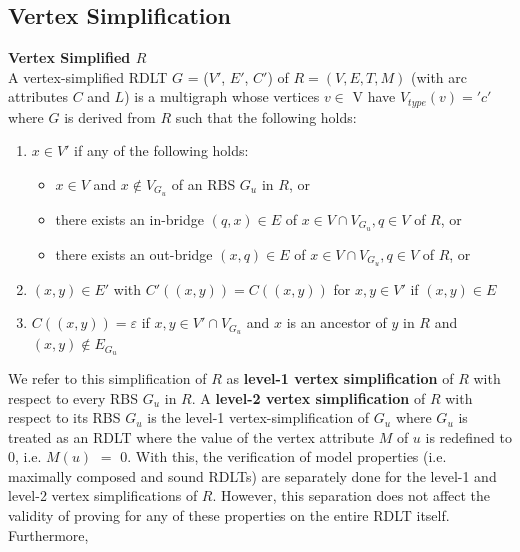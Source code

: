\subsection*{Vertex Simplification}
\begin{defn}\textbf{Vertex Simplified $R$} \cite{Malinao2017}\\
    \label{VertexSimpDef}
     A vertex-simplified RDLT $ G $ = ($ V' $, $ E' $, $ C' $) of $ R = (V, E, T, M) $ (with arc attributes $ C $ and $ L $) is a multigraph whose vertices $ v \in $ V have $ V_{type}(v) = 'c' $ where $ G $ is derived from $ R $ such that the following holds:
     \begin{enumerate}
         \item $ x \in V' $ if any of the following holds:
         \begin{itemize}
             \item $ x \in V $ and $ x \notin V_{G_u} $ of an RBS $ G_u $ in $ R $, or
             \item there exists an in-bridge $ (q, x) \in E $ of $ x \in V \cap V_{G_u}, q \in V $ of $ R $, or
             \item there exists an out-bridge $ (x, q) \in E $ of $ x \in V \cap V_{G_u}, q \in V $ of $ R $, or
         \end{itemize}
         \item $ (x, y) \in E' $ with $ C'((x, y)) = C((x, y)) $ for $ x, y \in V' $ if $ (x, y) \in E $
         \item $ C((x, y)) = \varepsilon $ if $ x, y \in V' \cap V_{G_u} $ and $ x $ is an ancestor of $ y $ in $ R $ and $ (x, y) \notin E_{G_u} $  
     \end{enumerate}

     We refer to this simplification of $ R $ as \textbf{level-1 vertex simplification} of $ R $ with respect to every RBS $ G_u $ in $ R $. A \textbf{level-2 vertex simplification} of $ R $ with respect to its RBS $ G_u $ is the level-1 vertex-simplification of $ G_u $ where $ G_u $ is treated as an RDLT where the value of the vertex attribute $ M $ of $ u $ is redefined to $ 0 $, i.e. $ M(u) $ $ = $ $ 0 $. With this, the verification of model properties (i.e. maximally composed and sound RDLTs) are separately done for the level-1 and level-2 vertex simplifications of $ R $. However, this separation does not affect the validity of proving for any of these properties on the entire RDLT itself. Furthermore, 
 \end{defn}

